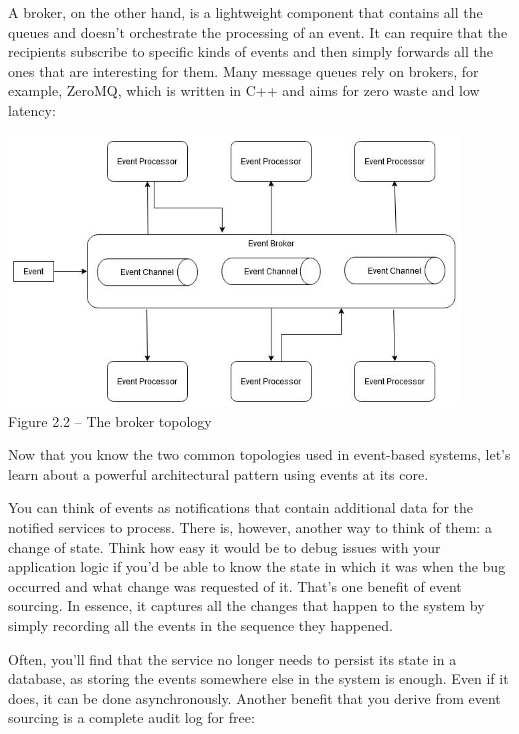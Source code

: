 A broker, on the other hand, is a lightweight component that contains all the queues and doesn't orchestrate the processing of an event. It can require that the recipients subscribe to specific kinds of events and then simply forwards all the ones that are interesting for them. Many message queues rely on brokers, for example, ZeroMQ, which is written in C++ and aims for zero waste and low latency:


\begin{center}
\includegraphics[width=0.9\textwidth]{content/1/chapter2/images/2.jpg}\\
Figure 2.2 – The broker topology
\end{center}

Now that you know the two common topologies used in event-based systems, let's learn about a powerful architectural pattern using events at its core.




You can think of events as notifications that contain additional data for the notified services to process. There is, however, another way to think of them: a change of state. Think how easy it would be to debug issues with your application logic if you'd be able to know the state in which it was when the bug occurred and what change was requested of it. That's one benefit of event sourcing. In essence, it captures all the changes that happen to the system by simply recording all the events in the sequence they happened.

Often, you'll find that the service no longer needs to persist its state in a database, as storing the events somewhere else in the system is enough. Even if it does, it can be done asynchronously. Another benefit that you derive from event sourcing is a complete audit log for free:


